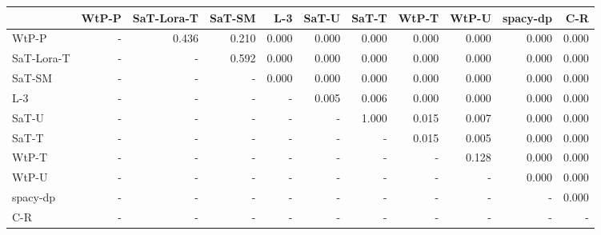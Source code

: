 \begin{tabular}{lrrrrrrrrrr}
\toprule
 & WtP-P & SaT-Lora-T & SaT-SM & L-3 & SaT-U & SaT-T & WtP-T & WtP-U & spacy-dp & C-R \\
\midrule
WtP-P & - & 0.436 & 0.210 & 0.000 & 0.000 & 0.000 & 0.000 & 0.000 & 0.000 & 0.000 \\
SaT-Lora-T & - & - & 0.592 & 0.000 & 0.000 & 0.000 & 0.000 & 0.000 & 0.000 & 0.000 \\
SaT-SM & - & - & - & 0.000 & 0.000 & 0.000 & 0.000 & 0.000 & 0.000 & 0.000 \\
L-3 & - & - & - & - & 0.005 & 0.006 & 0.000 & 0.000 & 0.000 & 0.000 \\
SaT-U & - & - & - & - & - & 1.000 & 0.015 & 0.007 & 0.000 & 0.000 \\
SaT-T & - & - & - & - & - & - & 0.015 & 0.005 & 0.000 & 0.000 \\
WtP-T & - & - & - & - & - & - & - & 0.128 & 0.000 & 0.000 \\
WtP-U & - & - & - & - & - & - & - & - & 0.000 & 0.000 \\
spacy-dp & - & - & - & - & - & - & - & - & - & 0.000 \\
C-R & - & - & - & - & - & - & - & - & - & - \\
\bottomrule
\end{tabular}

